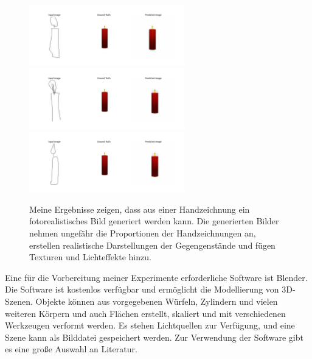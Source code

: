 \begin{figure}[h]
	\includegraphics[width=0.6\textwidth]{bilder/candle1small.png}
	\includegraphics[width=0.6\textwidth]{bilder/candle2small.png}
	\includegraphics[width=0.6\textwidth]{bilder/candle3small.png}
	\caption[Eigene Beispiele]{Meine Ergebnisse zeigen, dass aus einer Handzeichnung ein fotorealistisches Bild generiert werden kann. Die generierten Bilder nehmen ungefähr die Proportionen der Handzeichnungen an, erstellen realistische Darstellungen der Gegengenstände und fügen Texturen und Lichteffekte hinzu.}
	\label{fig:myexamples}
\end{figure}

Eine für die Vorbereitung meiner Experimente erforderliche Software ist Blender. Die Software ist kostenlos verfügbar und ermöglicht die Modellierung von 3D-Szenen. Objekte können aus vorgegebenen Würfeln, Zylindern und vielen weiteren Körpern und auch Flächen erstellt, skaliert und mit verschiedenen Werkzeugen verformt werden. Es stehen Lichtquellen zur Verfügung, und eine Szene kann als Bilddatei gespeichert werden. Zur Verwendung der Software gibt es eine große Auswahl an Literatur. 
